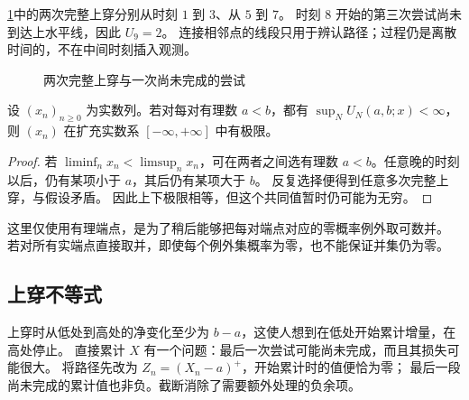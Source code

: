 \ProseParagraphBreak

\cref{b1:fig:upcrossing-31}中的两次完整上穿分别从时刻 \(1\) 到 \(3\)、从 \(5\) 到 \(7\)。
时刻 \(8\) 开始的第三次尝试尚未到达上水平线，因此 \(U_9=2\)。
连接相邻点的线段只用于辨认路径；过程仍是离散时间的，不在中间时刻插入观测。

\begin{figure}[htbp]
\centering
{}
\caption{两次完整上穿与一次尚未完成的尝试}
\label{b1:fig:upcrossing-31}
\end{figure}

\begin{lemma}[上穿与极限]
\label{b1:lem:upcrossing-path-31}
设 \((x_n)_{n\geq0}\) 为实数列。若对每对有理数 \(a<b\)，都有
\(\sup_N U_N(a,b;x)<\infty\)，则 \((x_n)\) 在扩充实数系
\([-\infty,+\infty]\) 中有极限。
\end{lemma}
\begin{proof}
若 \(\liminf_n x_n<\limsup_n x_n\)，可在两者之间选有理数
\(a<b\)。任意晚的时刻以后，仍有某项小于 \(a\)，其后仍有某项大于 \(b\)。
反复选择便得到任意多次完整上穿，与假设矛盾。
因此上下极限相等，但这个共同值暂时仍可能为无穷。
\end{proof}

这里仅使用有理端点，是为了稍后能够把每对端点对应的零概率例外取可数并。
若对所有实端点直接取并，即使每个例外集概率为零，也不能保证并集仍为零。

\subsection{上穿不等式}
\label{b1:subsec:310502}

上穿时从低处到高处的净变化至少为 \(b-a\)，这使人想到在低处开始累计增量，在高处停止。
直接累计 \(X\) 有一个问题：最后一次尝试可能尚未完成，而且其损失可能很大。
将路径先改为 \(Z_n=(X_n-a)^+\)，开始累计时的值便恰为零；
最后一段尚未完成的累计值也非负。截断消除了需要额外处理的负余项。

